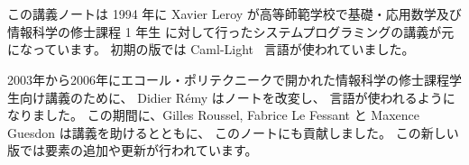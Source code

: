 %
%

\chapter*{\label{sec/intro}}
\enlargethispage{2\baselineskip} %

この講義ノートは 1994 年に Xavier Leroy が高等師範学校で基礎・応用数学及び情報科学の修士課程 1 年生
に対して行ったシステムプログラミングの講義が元になっています。
初期の版では Caml-Light~\cite{Caml-Light} 言語が使われていました。

%
2003年から2006年にエコール・ポリテクニークで開かれた情報科学の修士課程学生向け講義のために、
Didier R\'emy はノートを改変し、 \ocaml \cite{OCaml} 言語が使われるようになりました。
この期間に、Gilles Roussel, Fabrice Le Fessant と Maxence Guesdon は講義を助けるとともに、
このノートにも貢献しました。
この新しい版では要素の追加や更新が行われています。

